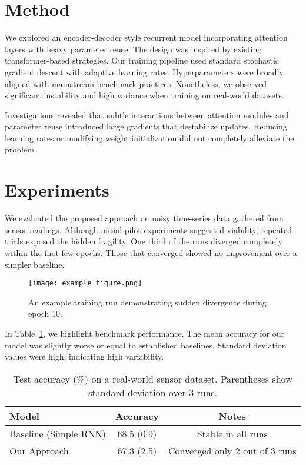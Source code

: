 \documentclass{article}
\begin{document}
\section{Method}
We explored an encoder-decoder style recurrent model incorporating attention layers with heavy parameter reuse. The design was inspired by existing transformer-based strategies. Our training pipeline used standard stochastic gradient descent with adaptive learning rates. Hyperparameters were broadly aligned with mainstream benchmark practices. Nonetheless, we observed significant instability and high variance when training on real-world datasets. 

Investigations revealed that subtle interactions between attention modules and parameter reuse introduced large gradients that destabilize updates. Reducing learning rates or modifying weight initialization did not completely alleviate the problem.

\section{Experiments}
We evaluated the proposed approach on noisy time-series data gathered from sensor readings. Although initial pilot experiments suggested viability, repeated trials exposed the hidden fragility. One third of the runs diverged completely within the first few epochs. Those that converged showed no improvement over a simpler baseline. 

\vspace{1em}
\begin{figure}[h]
\centering
\texttt{[image: example\_figure.png]}
\caption{An example training run demonstrating sudden divergence during epoch 10.}
\label{fig:divergence}
\end{figure}
\vspace{1em}

In Table~\ref{tab:results}, we highlight benchmark performance. The mean accuracy for our model was slightly worse or equal to established baselines. Standard deviation values were high, indicating high variability.

\begin{table}[h]
\centering
\caption{Test accuracy (\%) on a real-world sensor dataset. Parentheses show standard deviation over 3 runs.}
\label{tab:results}
\begin{tabular}{lcc}
\hline
Model & Accuracy & Notes \\
\hline
Baseline (Simple RNN) & 68.5 (0.9) & Stable in all runs \\
Our Approach & 67.3 (2.5) & Converged only 2 out of 3 runs \\
\hline
\end{tabular}
\end{table}
\end{document}
